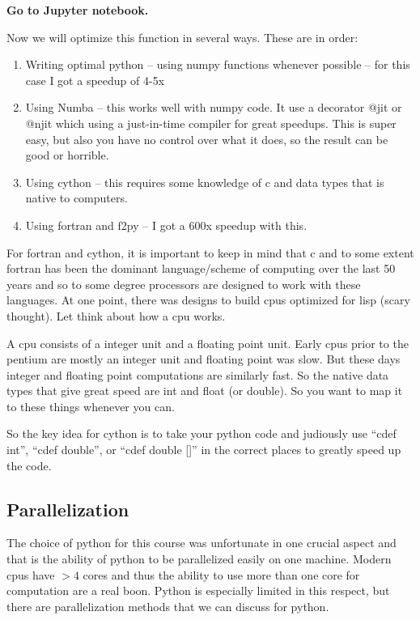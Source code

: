 \textbf{Go to Jupyter notebook.}

Now we will optimize this function in several ways.  These are in order:
\begin{enumerate}
    \item Writing optimal python -- using numpy functions whenever possible -- for this case I got a speedup of 4-5x
    \item Using Numba -- this works well with numpy code.  It use a decorator @jit or @njit which using a just-in-time compiler for great speedups.  This is super easy, but also you have no control over what it does, so the result can be good or horrible.  
    \item Using cython -- this requires some knowledge of c and data types that is native to computers.
    \item Using fortran and f2py -- I got a 600x speedup with this. 
\end{enumerate}

For fortran and cython, it is important to keep in mind that c and to some extent fortran has been the dominant language/scheme of computing over the last 50 years and so to some degree processors are designed to work with these languages. At one point, there was designs to build cpus optimized for lisp (scary thought).  Let think about how a cpu works.  

A cpu consists of a integer unit and a floating point unit.  Early cpus prior to the pentium are mostly an integer unit and floating point was slow.  But these days integer and floating point computations are similarly fast.  So the native data types that give great speed are int and float (or double).  So you want to map it to these things whenever you can. 

So the key idea for cython is to take your python code and judiously use ``cdef int'', ``cdef double'', or ``cdef double []'' in the correct places to greatly speed up the code.  

\subsection{Parallelization}

The choice of python for this course was unfortunate in one crucial aspect and that is the ability of python to be parallelized easily on one machine.  Modern cpus have $>4$ cores and thus the ability to use more than one core for computation are a real boon.  Python is especially limited in this respect, but there are parallelization methods that we can discuss for python.  

